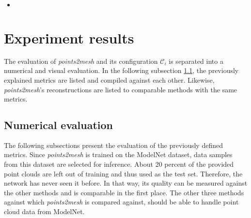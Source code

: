 \begin{itemize}
    \item {}
\end{itemize}

\section{Experiment results}
\label{subsec:results}
    The evaluation of \emph{points2mesh} and its configuration $\mathcal{C}_i$ is separated into a numerical and visual evaluation.
    In the following subsection \ref{numericeval}, the previously explained metrics are listed and compiled against each other.
    Likewise, \emph{points2mesh}'s reconstructions are listed to comparable methods with the same metrics.
\subsection{Numerical evaluation}
\label{numericeval}
    The following subsections present the evaluation of the previously defined metrics. Since \emph{points2mesh} 
    is trained on the ModelNet dataset, data samples from this dataset are selected for inference. About 20 percent 
    of the provided point clouds are left out of training and thus used as the test set. Therefore, the network has 
    never seen it before. In that way, its quality can be measured against the other methods and is comparable in the
    first place. The other three methods against which \emph{points2mesh} is compared against, should be able to handle
    point cloud data from ModelNet.
